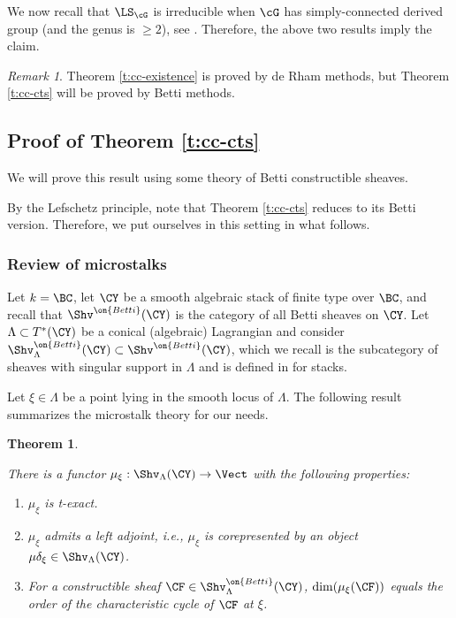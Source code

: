 \documentclass[9pt]{amsart}
\newtheorem{thm}[subsubsection]{Theorem}
\theoremstyle{remark}
\newtheorem{rem}[subsubsection]{Remark}
\theoremstyle{definition}
\theoremstyle{remark}
\numberwithin{equation}{section}
\begin{document}
We now recall that $\LS_{\cG}$ is irreducible when $\cG$ has simply-connected
derived group (and the genus is $\geq 2$), see \cite[Prop. 2.11.4]{BD}. 
Therefore, the above two results
imply the claim.

\begin{rem}

Theorem \ref{t:cc-existence} is proved by de Rham methods, but 
Theorem \ref{t:cc-cts} will be proved by Betti methods.

\end{rem}

\subsection{Proof of Theorem \ref{t:cc-cts}}

We will prove this result using some theory of Betti constructible sheaves.

\medskip 

By the Lefschetz principle, note that Theorem \ref{t:cc-cts} reduces to 
its Betti version. Therefore, we put ourselves in this setting in what follows.

\subsubsection{Review of microstalks}

Let $k = \BC$, let $\CY$ be a smooth algebraic stack of finite type over $\BC$, 
and recall that $\Shv^{\on{Betti}}(\CY)$ is the category of all Betti sheaves on
$\CY$. Let $\Lambda \subset T^*(\CY)$ be a conical (algebraic) Lagrangian 
and consider
$\Shv_{\Lambda}^{\on{Betti}}(\CY) \subset \Shv^{\on{Betti}}(\CY)$,
which we recall is the subcategory of sheaves with singular support in 
$\Lambda$ and is defined in \cite[Sect. F.6]{AGKRRV} for stacks.

\medskip

Let $\xi \in \Lambda$ be a point lying in the smooth locus of $\Lambda$. 
The following result summarizes the microstalk theory for our needs.

\begin{thm}\label{t:microstalk}

There is a functor $\mu_{\xi}:\Shv_{\Lambda}(\CY) \to \Vect$ with the
following properties:

\begin{enumerate}

\item\label{i:micro-exact} $\mu_{\xi}$ is t-exact.

\item\label{i:micro-corep} $\mu_{\xi}$ admits a left adjoint, i.e., 
$\mu_{\xi}$ is corepresented by an object $\mu\delta_{\xi} \in \Shv_{\Lambda}(\CY)$.

\item\label{i:micro-cc} For a constructible sheaf $\CF \in \Shv_{\Lambda}^{\on{Betti}}(\CY)$,
$\dim(\mu_{\xi}(\CF))$ equals the order of the characteristic cycle of 
$\CF$ at $\xi$.

\end{enumerate}

\end{thm}
\end{document}
